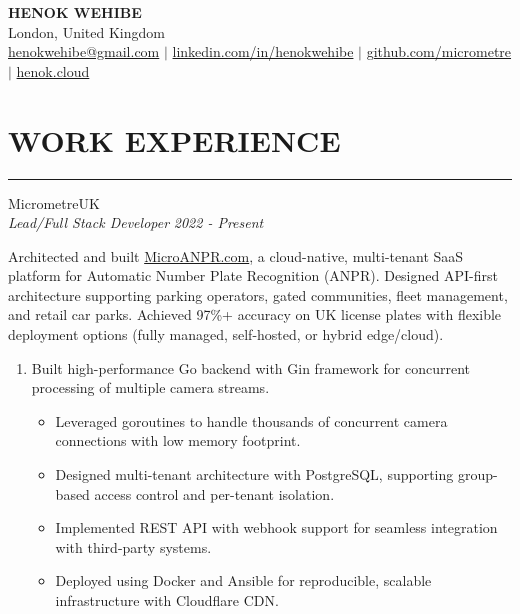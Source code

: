 \documentclass{article}
\begin{document}
\begin{center}
\textbf{\huge HENOK WEHIBE} \\
\vspace{1.0em}
London, United Kingdom \\
\vspace{0.5em}
\href{mailto:henokwehibe@gmail.com}{henokwehibe@gmail.com} $|$
\href{https://linkedin.com/in/henokwehibe}{linkedin.com/in/henokwehibe} $|$
\href{https://github.com/micrometre}{github.com/micrometre} $|$
\href{https://henok.cloud}{henok.cloud}\\
\end{center}
\vspace{-3.6em}
\section* {WORK EXPERIENCE}
\vspace{0.6em}
\hrule 
{\bf}{} MicrometreUK \hfill {} \\%
{\em Lead/Full Stack Developer} \hfill {\em 2022 - Present } %

Architected and built \href{https://microanpr.com}{MicroANPR.com}, a cloud-native, multi-tenant SaaS platform for Automatic Number Plate Recognition (ANPR). Designed API-first architecture supporting parking operators, gated communities, fleet management, and retail car parks. Achieved 97\%+ accuracy on UK license plates with flexible deployment options (fully managed, self-hosted, or hybrid edge/cloud).



\begin{enumerate}
    \item[] Built high-performance Go backend with Gin framework for concurrent processing of multiple camera streams.
   \begin{itemize}
    \item Leveraged goroutines to handle thousands of concurrent camera connections with low memory footprint.
    \item Designed multi-tenant architecture with PostgreSQL, supporting group-based access control and per-tenant isolation.
    \item Implemented REST API with webhook support for seamless integration with third-party systems.
    \item Deployed using Docker and Ansible for reproducible, scalable infrastructure with Cloudflare CDN.
   \end{itemize}
\end{enumerate}
\end{document}
